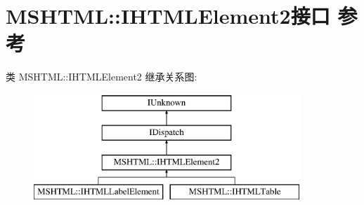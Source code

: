 \hypertarget{interface_m_s_h_t_m_l_1_1_i_h_t_m_l_element2}{}\section{M\+S\+H\+T\+ML\+:\+:I\+H\+T\+M\+L\+Element2接口 参考}
\label{interface_m_s_h_t_m_l_1_1_i_h_t_m_l_element2}
类 M\+S\+H\+T\+ML\+:\+:I\+H\+T\+M\+L\+Element2 继承关系图\+:\begin{figure}[H]
\begin{center}
\leavevmode
\includegraphics[height=4.000000cm]{interface_m_s_h_t_m_l_1_1_i_h_t_m_l_element2}
\end{center}
\end{figure}
